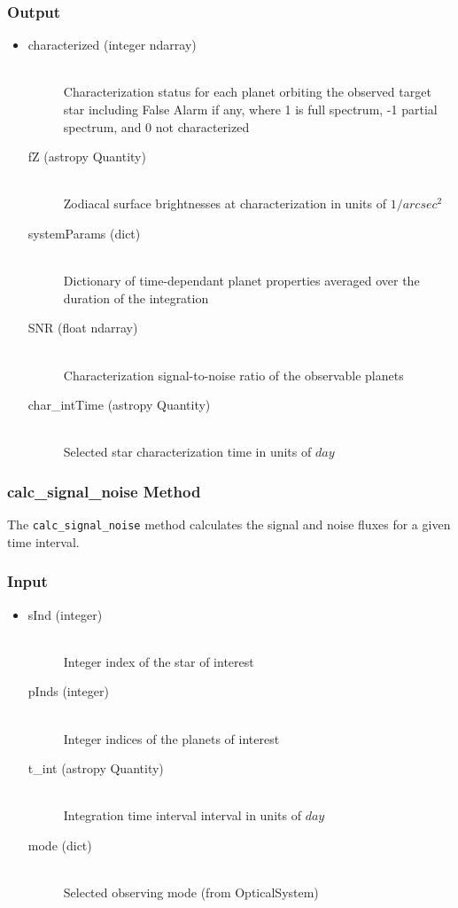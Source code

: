 \documentclass[cleanfoot]{asme2ej}
\begin{document}
\subsubsection*{Output}
\begin{itemize}
\item
\begin{description}
    \item[characterized (integer ndarray)] \hfill \\ Characterization status for each planet orbiting the observed target star including False Alarm if any, where 1 is full spectrum, -1 partial spectrum, and 0 not characterized
    \item[fZ (astropy Quantity)] \hfill \\ Zodiacal surface brightnesses at characterization in units of $1/arcsec^2$
    \item[systemParams (dict)] \hfill \\ Dictionary of time-dependant planet properties averaged over the duration of the integration
    \item[SNR (float ndarray)] \hfill \\ Characterization signal-to-noise ratio of the observable planets
    \item[char\_intTime (astropy Quantity)] \hfill \\ Selected star characterization time in units of $day$
\end{description}
\end{itemize}

\subsubsection{calc\_signal\_noise Method} \label{sec:calcsignalnoisetask}
The \verb+calc_signal_noise+ method calculates the signal and noise fluxes for a given time interval. 

\subsubsection*{Input}
\begin{itemize}
\item
\begin{description}
    \item[sInd (integer)] \hfill \\ Integer index of the star of interest
    \item[pInds (integer)] \hfill \\ Integer indices of the planets of interest
    \item[t\_int (astropy Quantity)] \hfill \\ Integration time interval interval in units of $day$
    \item[mode (dict)] \hfill \\ Selected observing mode (from OpticalSystem)
\end{description}
\end{itemize}
\end{document}
